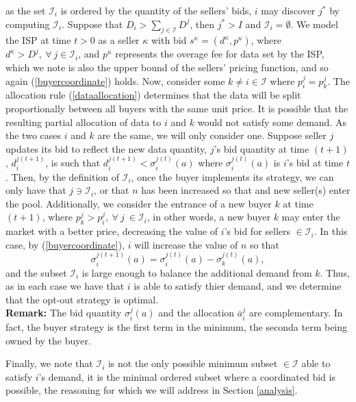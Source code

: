 \documentclass[12pt]{article}
\theoremstyle{definition}
\newcommand{\mcI}{\mathcal{I}}
\newcommand{\g}{\sigma}
\begin{document}
\begin{multicols}{2}
as the set $\mcI_i$ is ordered by the quantity of the sellers' bids, $i$ may discover 
$j^*$ by computing $\mcI_i$.
Suppose that $D_i >
\sum_{j\in\mcI}D^j$, then $j^* > I$ and $\mcI_i = \emptyset$. 
We model the ISP at time $t>0$ as a seller $\kappa$ with bid $s^\kappa =(d^\kappa, p^\kappa)$,
where $d^\kappa > D^j, \
\forall \ j\in\mcI_i$, and
$p^\kappa$ represents the overage fee for data set by the ISP, which we note is also the upper bound of the sellers'
pricing function, and so again (\ref{buyercoordinate}) holds.
Now, consider some $k \ne i \in \mcI$ where $p_i^j = p_k^j$. 
The allocation rule (\ref{dataallocation}) determines that the data will be
split proportionally
between all buyers with the same unit price. 
It is possible that the resulting partial allocation of data to $i$ and $k$
would not satisfy some demand. As the two cases $i$ and $k$ are the same, we
will only consider one. Suppose seller $j$ updates its
bid to reflect the new data quantity, $j$'s bid quantity at time $(t+1)$,
$d_i^{j(t+1)}$, is such that
$d_i^{j(t+1)} < \g_i^{j(t)}(a)$ where $\g_i^{j(t)}(a)$ is $i$'s bid at time $t$.
Then, by the definition of $\mcI_i$, once the buyer implements its strategy, we can
only have that $j \ni \mcI_i$, or that $n$ has been increased so that and new seller(s)
enter the pool. 
Additionally, we consider the entrance of a new buyer $k$ at time $(t+1)$, where $p_k^j > p_i^j, \ \forall \ j \ \in \mcI_i$, in other
words, a new buyer $k$ may enter the market with a better price, decreasing the
value of $i$'s bid for sellers $\in\mcI_i$. In this case, by (\ref{buyercoordinate}), $i$ will increase the value of
$n$ so that
$$
    \g_i^{j(t+1)}(a) = \g_i^{j(t)}(a) - \g_k^{j(t)}(a),
$$
and the subset $\mcI_i$ is large enough to balance the additional demand from
$k$. Thus, as in each case we have that $i$ is able to satisfy thier demand,
and we determine that the opt-out strategy is optimal.\\
\textbf{Remark:} The bid quantity $\g_i^j(a)$ and the allocation $\bar{a}_i^j$
are complementary. In fact, the buyer strategy is the first term in the
minimum, the seconda term being owned by the buyer.

Finally, we note that $\mcI_i$ is not the only
possible minimum subset $\in\mcI$ able to satisfy $i$'s demand, it is the
minimal ordered subset where a
coordinated bid is possible, the reasoning for which we will address in Section
\ref{analysis}. 


\end{multicols}
\end{document}
